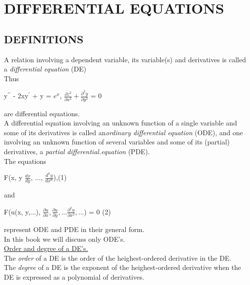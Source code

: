\documentclass[11pt]{amsbook}
\begin{document}

\chapter{DIFFERENTIAL EQUATIONS}

\section{DEFINITIONS}
A relation involving a dependent variable, its variable(s) and derivatives is called a \textit{differential equation} (DE)\\  

Thus
\begin{center}
 y$^{\prime\prime}$ - 2xy$^\prime$ + y = $e^x$, $\frac{\partial z^2}{\partial x^2} +  \frac{\partial ^2 y}{\partial y^2}$ = 0\
 \end{center}
are differential equations.\\

A differential equation involving an   unknown function of a single variable and some of its derivatives is called an\textit{ordinary differential equation} (ODE), and one involving an unknown function of several variables and some of its (partial) derivatives, a  \textit{partial differential.equation} (PDE).\\

The equations \\
\begin{center}
 F(x, y $\frac{dx}{dy}$, ..., $\frac{d^n y}{dx^n}$),\qquad\qquad\qquad \hspace{7mm}(1)\\
 \end{center}

and \\
\begin{center}
 F(u(x, y,...), $\frac{\partial u}{\partial x} , \frac{\partial u}{\partial y} ,... \frac{\partial^2 u}{\partial x^2},...$) = 0  \hspace{3mm}  (2)
 \end{center}
represent ODE and PDE in their general form.\\

In this book we will discuss only ODE's.\\

\underline{Order and degree of a DE's.}\\

The \textit{order} of a DE is the order of the heighest-ordered derivative in the DE.\\

The \textit{degree} of a DE is the exponent of the heighest-ordered derivative when the DE is expressed as a polynomial of derivatives.
\end{document}
